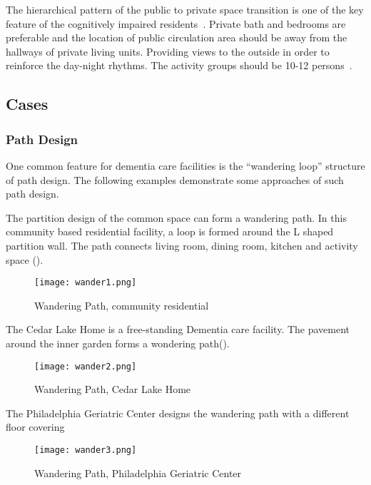 The hierarchical pattern of the public to private space transition is
one of the key feature of the cognitively impaired
residents~\cite{seniorLiving}. Private bath and bedrooms are
preferable and the location of public circulation area should be away
from the hallways of private living units. Providing views to the
outside in order to reinforce the day-night rhythms. The activity
groups should be 10-12 persons~\cite{seniorLiving}.

\subsection{Cases}
\subsubsection{Path Design}
One common feature for dementia care facilities is the ``wandering
loop'' structure of path design. The following examples demonstrate
some approaches of such path design.

The partition design of the common space can form a wandering path. In
this community based residential facility, a loop is formed around the
L shaped partition wall. The path connects living room, dining room,
kitchen and activity space ().

\begin{figure}[htbp]
  \centering
  \texttt{[image: wander1.png]}
  \caption[Wandering Path, Community Based Residential]{Wandering
    Path, community residential~\cite{dementiaCase}}
  \label{fig:wander1}
\end{figure}

The Cedar Lake Home is a free-standing Dementia care facility. The
pavement around the inner garden forms a wondering
path().

\begin{figure}[htbp]
  \centering
  \texttt{[image: wander2.png]}
  \caption[Wandering Path, Cedar Lake Home]{Wandering Path, Cedar Lake Home~\cite{dementiaCase}}
  \label{fig:wander2}
\end{figure}

The Philadelphia Geriatric Center designs the wandering path with a
different floor covering
\begin{figure}[htbp]
  \centering
  \texttt{[image: wander3.png]}
  \caption[Wandering Path, Philadelphia Geriatric Center]{Wandering Path, Philadelphia Geriatric Center~\cite{dementiaCase}}
  \label{fig:wander3}
\end{figure}

